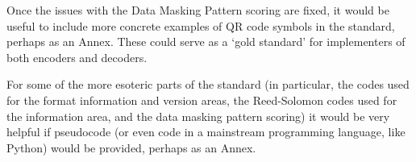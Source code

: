 \documentclass[a4paper,twoside]{article}
\begin{document}
Once the issues with the Data Masking Pattern scoring are fixed, it would be useful to include more concrete examples
of QR code symbols in the standard, perhaps as an Annex. These could serve as a `gold standard' for implementers of both
encoders and decoders.

For some of the more esoteric parts of the standard (in particular, the codes used for the format information and version areas,
the Reed-Solomon codes used for the information area, and the data masking pattern scoring) it would be very helpful if pseudocode
(or even code in a mainstream programming language, like Python) would be provided, perhaps as an Annex.
\end{document}
